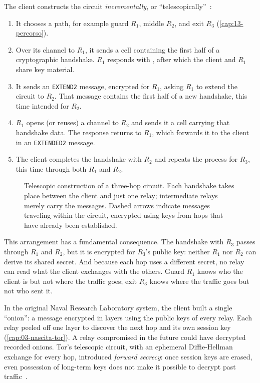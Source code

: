 The client constructs the circuit \emph{incrementally}, or \enquote{telescopically}~\cite{dingledine2004tor}:
\begin{enumerate}
  \item It chooses a path, for example guard $R_1$, middle $R_2$, and exit $R_3$ (\cref{cap:13-percorso}).
  \item Over its channel to $R_1$, it sends a  cell containing the first half of a cryptographic handshake. $R_1$ responds with , after which the client and $R_1$ share key material.
  \item It sends an \texttt{EXTEND2} message, encrypted for $R_1$, asking $R_1$ to extend the circuit to $R_2$. That message contains the first half of a new handshake, this time intended for $R_2$.
  \item $R_1$ opens (or reuses) a channel to $R_2$ and sends it a  cell carrying that handshake data. The  response returns to $R_1$, which forwards it to the client in an \texttt{EXTENDED2} message.
  \item The client completes the handshake with $R_2$ and repeats the process for $R_3$, this time through both $R_1$ and $R_2$.
\end{enumerate}

\begin{figure}[htbp]
\centering

\caption{Telescopic construction of a three-hop circuit. Each handshake takes place between the client and just one relay; intermediate relays merely carry the messages. Dashed arrows indicate messages traveling within the circuit, encrypted using keys from hops that have already been established.}
\label{fig:telescopio}
\end{figure}

This arrangement has a fundamental consequence. The handshake with $R_3$ passes through $R_1$ and $R_2$, but it is encrypted for $R_3$'s public key: neither $R_1$ nor $R_2$ can derive its shared secret. And because each hop uses a different secret, no relay can read what the client exchanges with the others. Guard $R_1$ knows who the client is but not where the traffic goes; exit $R_3$ knows where the traffic goes but not who sent it.

\begin{storia}
In the original Naval Research Laboratory system, the client built a single \enquote{onion}: a message encrypted in layers using the public keys of every relay. Each relay peeled off one layer to discover the next hop and its own session key (\cref{cap:03-nascita-tor}). A relay compromised in the future could have decrypted recorded onions. Tor's telescopic circuit, with an ephemeral Diffie-Hellman exchange for every hop, introduced \emph{forward secrecy}: once session keys are erased, even possession of long-term keys does not make it possible to decrypt past traffic~\cite{dingledine2004tor}.
\end{storia}

